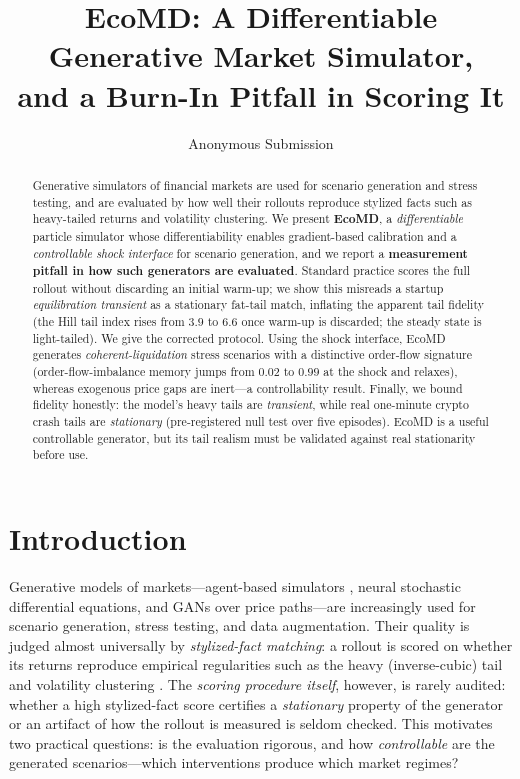 \documentclass{article}
\title{EcoMD: A Differentiable Generative Market Simulator,\\ and a Burn-In Pitfall in Scoring It}
\author{Anonymous Submission}
\date{}
\begin{document}
\maketitle

\begin{abstract}
Generative simulators of financial markets are used for scenario generation and stress testing, and
are evaluated by how well their rollouts reproduce stylized facts such as heavy-tailed returns and
volatility clustering. We present \textbf{EcoMD}, a \emph{differentiable} particle simulator whose
differentiability enables gradient-based calibration and a \emph{controllable shock interface} for
scenario generation, and we report a \textbf{measurement pitfall in how such generators are
evaluated}. Standard practice scores the full rollout without discarding an initial warm-up; we show
this misreads a startup \emph{equilibration transient} as a stationary fat-tail match, inflating the
apparent tail fidelity (the Hill tail index rises from $3.9$ to $6.6$ once warm-up is discarded; the
steady state is light-tailed). We give the corrected protocol. Using the shock interface, EcoMD
generates \emph{coherent-liquidation} stress scenarios with a distinctive order-flow signature
(order-flow-imbalance memory jumps from $0.02$ to $0.99$ at the shock and relaxes), whereas exogenous
price gaps are inert---a controllability result. Finally, we bound fidelity honestly: the model's
heavy tails are \emph{transient}, while real one-minute crypto crash tails are \emph{stationary}
(pre-registered null test over five episodes). EcoMD is a useful controllable generator, but its tail
realism must be validated against real stationarity before use.
\end{abstract}

\section{Introduction}
Generative models of markets---agent-based simulators \citep{byrd2020abides}, neural stochastic
differential equations, and GANs over price paths---are increasingly used for scenario generation,
stress testing, and data augmentation. Their quality is judged almost universally by
\emph{stylized-fact matching}: a rollout is scored on whether its returns reproduce empirical
regularities such as the heavy (inverse-cubic) tail and volatility clustering \citep{cont2001,gabaix2003}.
The \emph{scoring procedure itself}, however, is rarely audited: whether a high stylized-fact score
certifies a \emph{stationary} property of the generator or an artifact of how the rollout is measured
is seldom checked. This motivates two practical questions: is the evaluation rigorous, and how
\emph{controllable} are the generated scenarios---which interventions produce which market regimes?
\end{document}
